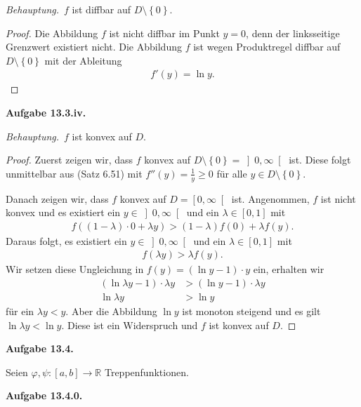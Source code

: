 \documentclass[draft,a5paper]{article}
\newcommand{\beh}{\textit{Behauptung.}\ }
\newcommand{\aufgn}[1]{\textbf{Aufgabe #1.}}
\newcommand{\mg}[1]{\mathbb{#1}}
\begin{document}
\beh \(f\) ist diffbar auf $D \setminus \left\{ 0
\right\}$.

\begin{proof}
  Die Abbildung \(f\) ist nicht diffbar im Punkt \(y = 0\),
  denn der linksseitige Grenzwert existiert nicht.  Die
  Abbildung \(f\) ist wegen Produktregel diffbar auf
  \(D \setminus \left\{ 0 \right\}\) mit der Ableitung
\begin{align*}
f'(y) = \ln y.
\end{align*}
\end{proof}

\aufgn{13.3.iv}

\beh \(f\) ist konvex auf \(D\).

\begin{proof}
  Zuerst zeigen wir, dass \(f\) konvex auf
  $D \setminus \left\{ 0 \right\} = \left]0,
    \infty\right[$ ist.  Diese folgt unmittelbar aus
  (Satz 6.51) mit \(f''(y) = \frac{1}{y} \ge 0\) für alle
  \(y \in D \setminus \left\{ 0 \right\}\).

  Danach zeigen wir, dass \(f\) konvex auf
  \(D = \left[0, \infty\right[\) ist.  Angenommen, \(f\) ist
  nicht konvex und es existiert ein
  \(y \in \left]0, \infty\right[\) und ein
  \(\lambda \in \left[0, 1\right]\) mit
\begin{align*}
f \left( (1- \lambda) \cdot 0 + \lambda y \right) > (1 -
  \lambda) f(0) + \lambda f(y).
\end{align*}
Daraus folgt, es  existiert ein
  \(y \in \left]0, \infty\right[\) und ein
  \(\lambda \in \left[0, 1\right]\) mit
\begin{align*}
f \left( \lambda y \right) >  \lambda f(y).
\end{align*}
Wir setzen diese Ungleichung in $f(y) = (\ln y - 1)
\cdot y$ ein, erhalten wir
\begin{align*}
(\ln \lambda y - 1) \cdot \lambda y &> (\ln y - 1) \cdot
                                      \lambda y \\
  \ln \lambda y &> \ln y
\end{align*}
für ein \(\lambda y < y\).  Aber die Abbildung \(\ln y\) ist
monoton steigend und es gilt \(\ln \lambda y < \ln y\).
Diese ist ein Widerspruch und \(f\) ist konvex auf \(D\).
\end{proof}

\aufgn{13.4}

Seien \(\varphi, \psi \colon \left[a, b\right] \to \mg{R}\)
Treppenfunktionen.

\aufgn{13.4.0}
\end{document}
